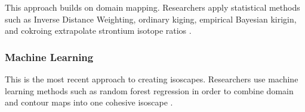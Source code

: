 \documentclass[a4paper, 12pt]{article}
\begin{document}
This approach builds on domain mapping. Researchers apply statistical methods
such as Inverse Distance Weighting, ordinary kiging, empirical Bayesian kirigin,
and cokroing extrapolate strontium isotope ratios \citep{holt2021}.

\subsubsection{Machine Learning}
This is the most recent approach to creating isoscapes. Researchers use machine
learning methods such as random forest regression in order to combine domain and contour
maps into one cohesive isoscape \citep{willmes2018}.





\end{document}
